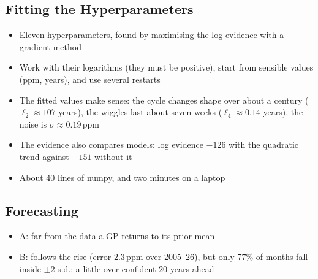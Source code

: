 \begin{slide}
\section[-1]{Fitting the Hyperparameters}

\begin{PauseHighLight}
  \begin{itemize}\squeeze
  \item Eleven hyperparameters, found by maximising the log evidence with
    a gradient method\pause
  \item Work with their logarithms (they must be positive), start from
    sensible values (ppm, years), and use several restarts\pause
  \item The fitted values make sense: the cycle changes shape over about
    a century ($\ell_2\approx107$ years), the wiggles last about seven
    weeks ($\ell_4\approx0.14$ years), the noise is
    $\sigma\approx0.19$\,ppm\pause
  \item The evidence also compares models: log evidence $-126$ with the
    quadratic trend against $-151$ without it\pause
  \item About 40 lines of numpy, and two minutes on a laptop\pause
  \end{itemize}
\end{PauseHighLight}

\end{slide}

\begin{slide}
\section[-2]{Forecasting}

\pb\pause{}
\begin{center}
  \pause
\end{center}
\begin{itemize}\squeeze{}
\item A: far from the data a GP returns to its prior mean\pauseh
\item B: follows the rise (error 2.3\,ppm over 2005--26), but only 77\%
  of months fall inside $\pm2$ s.d.: a little over-confident 20 years
  ahead\pauseh
\end{itemize}

\end{slide}


